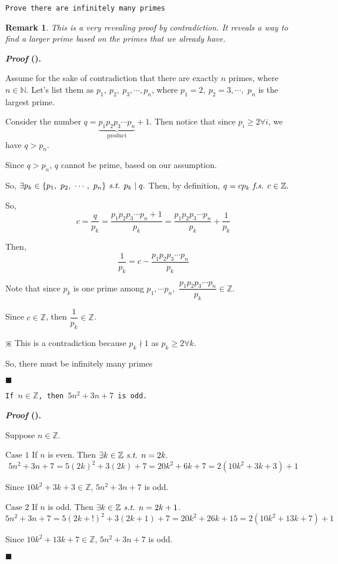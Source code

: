 \documentclass[12pt,a4paper]{article}
\newcounter{nprf}[subsection]
\newtheorem*{rmk}{\indent Remark}
\newenvironment*{prf}{\par\indent\textbf{\textit{Proof} (\stepcounter{nprf}\thenprf). }\par }{\par\hfill $\blacksquare$\par}
\def\Z{{\mathbb{Z}}}
\def\N{{\mathbb{N}}}
\def\st{\emph{ s.t. }}
\def\fs{\emph{ f.s. }}
\begin{document}
\begin{framed}
\noindent\texttt{Prove there are infinitely many primes}
\begin{rmk} This is a very revealing proof by contradiction. It reveals a way to find a larger prime based on the primes that we already have. \end{rmk}
\begin{prf}
	Assume for the sake of contradiction that there are exactly $n$ primes, where $n\in\N$. Let's list them as $p_1,\ p_2,\ p_3,\cdots,p_n$, where $p_1=2,\ p_2=3,\cdots,$ $p_n$ is the largest prime.\par Consider the number $q=\underbrace{p_1p_2p_3\cdots p_n}_{\text{product}}+1$. Then notice that since $p_i\geq2\forall i$, we have $q>p_n$.\par Since $q>p_n$, $q$ cannot be prime, based on our assumption.\par So, $\exists p_k\in\{p_1,\ p_2,\ \cdots,\ p_n\}\st p_k\mid q.$ Then, by definition, $q=cp_k\fs c\in\Z.$\par So, \[c=\frac{q}{p_k}=\frac{p_1p_2p_3\cdots p_n+1}{p_k}=\frac{p_1p_2p_3\cdots p_n}{p_k}+\frac{1}{p_k}\]\par Then, \[\frac{1}{p_k}=c-\frac{p_1p_2p_3\cdots p_n}{p_k}\]\par Note that since $p_k$ is one prime among $p_1,\cdots p_n,$ $\dfrac{p_1p_2p_3\cdots p_n}{p_k}\in\Z.$\par Since $c\in\Z$, then $\dfrac{1}{p_k}\in\Z$.\begin{center}$\divideontimes$ This is a contradiction because $p_k\nmid1$ as $p_k\geq2\forall k.$\end{center}\par So, there must be infinitely many primes
\end{prf}
\end{framed}
\begin{framed}
\noindent\texttt{If $n\in\Z$, then $5n^2+3n+7$ is odd.}
\begin{prf}
	Suppose $n\in\Z$.\par $\boxed{\text{Case }1}$ If $n$ is even. Then $\exists k\in\Z\st n=2k.$ \[5n^2+3n+7=5(2k)^2+3(2k)+7=20k^2+6k+7=2(10k^2+3k+3)+1\]\par\hspace{10mm}Since $10k^2+3k+3\in\Z$, $5n^2+3n+7$ is odd.\par $\boxed{\text{Case }2}$ If $n$ is odd. Then $\exists k\in\Z\st n=2k+1$.\[5n^2+3n+7=5(2k+!)^2+3(2k+1)+7=20k^2+26k+15=2(10k^2+13k+7)+1\]\par\hspace{10mm}Since $10k^2+13k+7\in\Z$, $5n^2+3n+7$ is odd.
\end{prf}
\end{framed}
\end{document}
